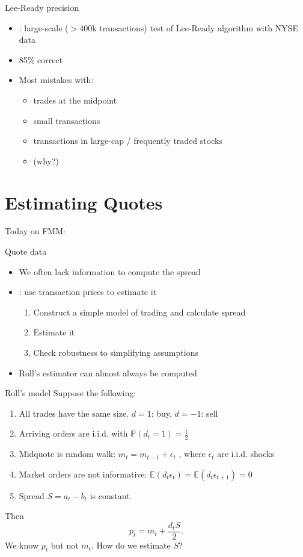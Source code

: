 \documentclass[english,10pt]{beamer}
\begin{document}
\begin{frame}{Lee-Ready precision}
	\begin{itemize}
		\item \citet{odders-white_occurrence_2000}: large-scale ($>400$k transactions) test of Lee-Ready algorithm with NYSE data
		\item 85\% correct
		\item Most mistakes with:
		\begin{itemize}
			\item trades at the midpoint
			\item small transactions
			\item transactions in large-cap / frequently traded stocks
			\item (why?)
		\end{itemize}
	\end{itemize}
\end{frame}



\section{Estimating Quotes}

\begin{frame}{Today on FMM:}
	\tableofcontents[currentsection]
\end{frame}


\begin{frame}{Quote data}
	\begin{itemize}
		\item We often lack information to compute the spread
		\item \citet{roll_simple_1984}: use transaction prices to estimate it
		\begin{enumerate}
			\item Construct a simple model of trading and calculate spread
			\item Estimate it
			\item Check robustness to simplifying assumptions
		\end{enumerate}
		\item Roll's estimator can almost always be computed
	\end{itemize}
\end{frame}


\begin{frame}{Roll's model}
	Suppose the following:
	\begin{enumerate}
		\item All trades have the same size. $d=1$: buy, $d=-1$: sell
		\item Arriving orders are i.i.d. with $\mathbb{P}(d_t =1)=\frac{1}{2}$
		\item Midquote is random walk: $m_t = m_{t-1} + \epsilon_t$  , where $\epsilon_t$ are i.i.d. shocks
		\item Market orders are not informative: $\mathbb{E}(d_t \epsilon_t)=\mathbb{E}(d_t \epsilon_{t+1})=0$
		\item Spread $S = a_t-b_t$ is constant.
	\end{enumerate}
	Then
	\[
	p_t = m_t + \frac{d_t S}{2}.
	\]
	We know $p_t$ but not $m_t$. How do we estimate $S$?
\end{frame}
\end{document}
